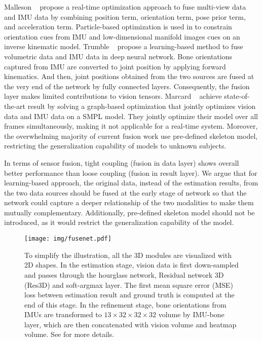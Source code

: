 \documentclass[10pt,twocolumn,letterpaper]{article}
\begin{document}
Malleson \etal~\cite{malleson2017real} propose a real-time optimization approach to fuse multi-view data and IMU data by combining position term, orientation term, pose prior term, and acceleration term. Particle-based optimization is used in \cite{Pons11} to constrain orientation cues from IMU and low-dimensional manifold images cues on an inverse kinematic model. Trumble \etal~\cite{trumble2017total} propose a learning-based method to fuse volumetric data and IMU data in deep neural network. Bone orientations captured from IMU are converted to joint position by applying forward kinematics. And then, joint positions obtained from the two sources are fused at the very end of the network by fully connected layers. Consequently, the fusion layer makes limited contributions to vision tensors. Marcard \etal~\cite{von2018recovering} achieve state-of-the-art result by solving a graph-based optimization that jointly optimizes vision data and IMU data on a SMPL model. They jointly optimize their model over all frames simultaneously, making it not applicable for a real-time system. Moreover, the overwhelming majority of current fusion work use pre-defined skeleton model, restricting the generalization capability of models to unknown subjects.

In terms of sensor fusion, tight coupling (fusion in data layer) shows overall better performance than loose coupling (fusion in result layer)\cite{8259006}. We argue that for learning-based approach, the original data, instead of the estimation results, from the two data sources should be fused at the early stage of network so that the network could capture a deeper relationship of the two modalities to make them mutually complementary. Additionally, pre-defined skeleton model should not be introduced, as it would restrict the generalization capability of the model. 








\begin{figure*}
\begin{center}
\texttt{[image: img/fusenet.pdf]}
\end{center}
  \vspace{-0.8cm}
  \caption{To simplify the illustration, all the 3D modules are visualized with 2D shapes. In the estimation stage, vision data is first down-sampled and passes through the hourglass network, Residual network 3D (Res3D) and soft-argmax layer. The first mean square error (MSE) loss between estimation result and ground truth is computed at the end of this stage. In the refinement stage, bone orientations from IMUs are transformed to $13\times32\times32\times32$ volume by IMU-bone layer, which are then concatenated with vision volume and heatmap volume. See  for more details.}
\label{fig:overall}
\vspace*{-0.2cm}
\end{figure*}
\end{document}
